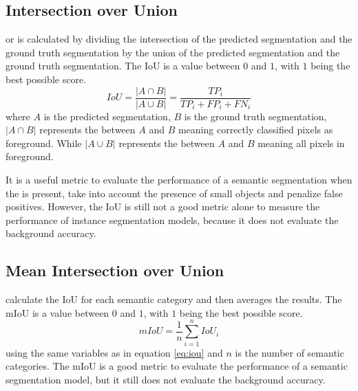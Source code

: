   \subsection{Intersection over Union}
    
     or  is calculated by dividing
    the intersection of the predicted segmentation and the ground truth segmentation by the union
    of the predicted segmentation and the ground truth segmentation\cite{long2015fully, paszke2016enet}.
    The IoU is a value between $0$ and $1$, with $1$ being the best possible score.
    \begin{equation}
      \label{eq:iou}
      IoU = \frac{{|A \cap B|}}{{|A \cup B|}} = \frac{TP_i}{TP_i + FP_i + FN_i}
    \end{equation}
    where $A$ is the predicted segmentation, $B$ is the ground truth segmentation,
    $|A \cap B|$ represents the  between $A$ and $B$ meaning
    correctly classified pixels as foreground. While $|A \cup B|$ represents the
     between $A$ and $B$ meaning all pixels in foreground.

    It is a useful metric to evaluate the performance of a semantic segmentation
    when the  is present, take into account the
    presence of small objects and penalize false positives. However, the IoU
    is still not a good metric alone to measure the performance of instance
    segmentation models, because it does not evaluate the background accuracy.

  \subsection{Mean Intersection over Union}

     calculate the IoU for each semantic
    category and then averages the results\cite{long2015fully, paszke2016enet}.
    The mIoU is a value between $0$ and $1$, with $1$ being the best possible score.
    \begin{equation}
      \label{eq:miou}
      mIoU = \frac{1}{n} \sum_{i=1}^{n} IoU_i
    \end{equation}
    using the same variables as in equation \ref{eq:iou} and $n$ is the number of
    semantic categories. The mIoU is a good metric to evaluate the performance of
    a semantic segmentation model, but it still does not evaluate the background
    accuracy.

